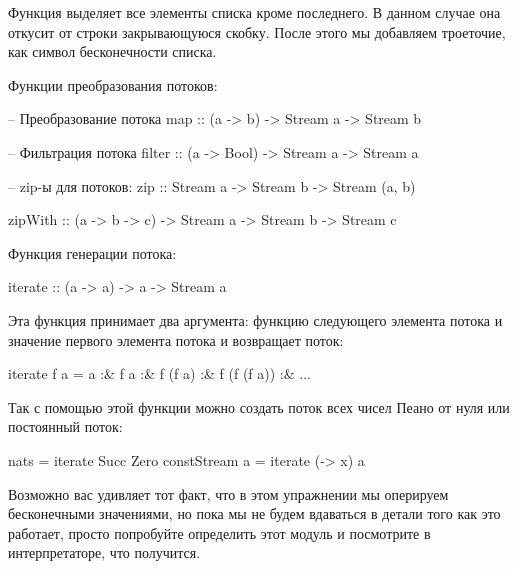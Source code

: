 Функция  выделяет все элементы списка кроме последнего. В
данном случае она откусит от строки закрывающуюся скобку. После этого мы
добавляем троеточие, как символ бесконечности списка.

Функции преобразования потоков:


\begin{code}
-- Преобразование потока
map :: (a -> b) -> Stream a -> Stream b

-- Фильтрация потока
filter :: (a -> Bool) -> Stream a -> Stream a

-- zip-ы для потоков:
zip :: Stream a -> Stream b -> Stream (a, b)

zipWith :: (a -> b -> c) -> Stream a -> Stream b -> Stream c 
\end{code}

Функция генерации потока:


\begin{code}
iterate :: (a -> a) -> a -> Stream a
\end{code}

Эта функция принимает два аргумента: функцию следующего элемента потока
и значение первого элемента потока и возвращает поток:


\begin{code}
iterate f a = a :& f a :& f (f a) :& f (f (f a)) :& ...
\end{code}

Так с помощью этой функции можно создать поток всех чисел Пеано от нуля
или постоянный поток:


\begin{code}
nats            = iterate Succ Zero 
constStream a   = iterate (\x -> x) a
\end{code}

Возможно вас удивляет тот факт, что в этом упражнении мы оперируем
бесконечными значениями, но пока мы не будем вдаваться в детали того как
это работает, просто попробуйте определить этот модуль и посмотрите в
интерпретаторе, что получится.
